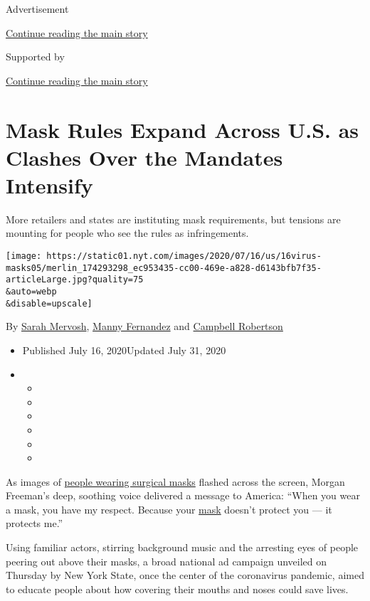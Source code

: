 Advertisement

\protect\hyperlink{after-top}{Continue reading the main story}

Supported by

\protect\hyperlink{after-sponsor}{Continue reading the main story}

\hypertarget{mask-rules-expand-across-us-as-clashes-over-the-mandates-intensify}{%
\section{Mask Rules Expand Across U.S. as Clashes Over the Mandates
Intensify}\label{mask-rules-expand-across-us-as-clashes-over-the-mandates-intensify}}

More retailers and states are instituting mask requirements, but
tensions are mounting for people who see the rules as infringements.

\texttt{[image: https://static01.nyt.com/images/2020/07/16/us/16virus-masks05/merlin\_174293298\_ec953435-cc00-469e-a828-d6143bfb7f35-articleLarge.jpg?quality=75\\\&auto=webp\\\&disable=upscale]}

By \href{https://www.nytimes.com/by/sarah-mervosh}{Sarah Mervosh},
\href{https://www.nytimes.com/by/manny-fernandez}{Manny Fernandez} and
\href{https://www.nytimes.com/by/campbell-robertson}{Campbell Robertson}

\begin{itemize}
\item
  Published July 16, 2020Updated July 31, 2020
\item
  \begin{itemize}
  \item
  \item
  \item
  \item
  \item
  \item
  \end{itemize}
\end{itemize}

As images of
\href{https://www.nytimes.com/interactive/2020/07/17/upshot/coronavirus-face-mask-map.html}{people
wearing surgical masks} flashed across the screen, Morgan Freeman's
deep, soothing voice delivered a message to America: ``When you wear a
mask, you have my respect. Because your
\href{https://www.nytimes.com/2020/07/29/us/politics/louie-gohmert-positive-coronavirus-mask.html}{mask}
doesn't protect you --- it protects me.''

Using familiar actors, stirring background music and the arresting eyes
of people peering out above their masks, a broad national ad campaign
unveiled on Thursday by New York State, once the center of the
coronavirus pandemic, aimed to educate people about how covering their
mouths and noses could save lives.

